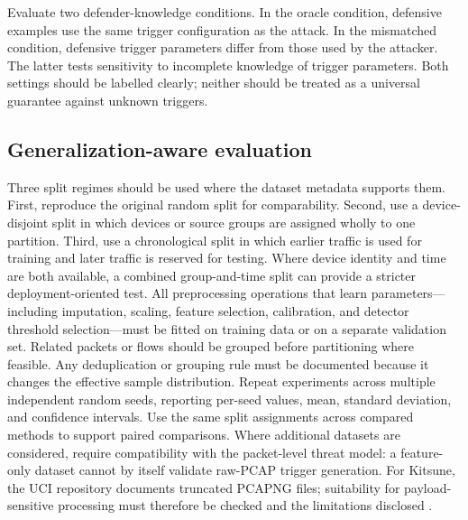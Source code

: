 \documentclass[11pt]{article}
\begin{document}
Evaluate two defender-knowledge conditions. In the oracle condition, defensive examples use the same trigger configuration as the attack. In the mismatched condition, defensive trigger parameters differ from those used by the attacker. The latter tests sensitivity to incomplete knowledge of trigger parameters. Both settings should be labelled clearly; neither should be treated as a universal guarantee against unknown triggers.

\subsection{Generalization-aware evaluation}
Three split regimes should be used where the dataset metadata supports them. First, reproduce the original random split for comparability. Second, use a device-disjoint split in which devices or source groups are assigned wholly to one partition. Third, use a chronological split in which earlier traffic is used for training and later traffic is reserved for testing. Where device identity and time are both available, a combined group-and-time split can provide a stricter deployment-oriented test. All preprocessing operations that learn parameters---including imputation, scaling, feature selection, calibration, and detector threshold selection---must be fitted on training data or on a separate validation set. Related packets or flows should be grouped before partitioning where feasible. Any deduplication or grouping rule must be documented because it changes the effective sample distribution. Repeat experiments across multiple independent random seeds, reporting per-seed values, mean, standard deviation, and confidence intervals. Use the same split assignments across compared methods to support paired comparisons. Where additional datasets are considered, require compatibility with the packet-level threat model: a feature-only dataset cannot by itself validate raw-PCAP trigger generation. For Kitsune, the UCI repository documents truncated PCAPNG files; suitability for payload-sensitive processing must therefore be checked and the limitations disclosed \cite{ref10}.
\end{document}
